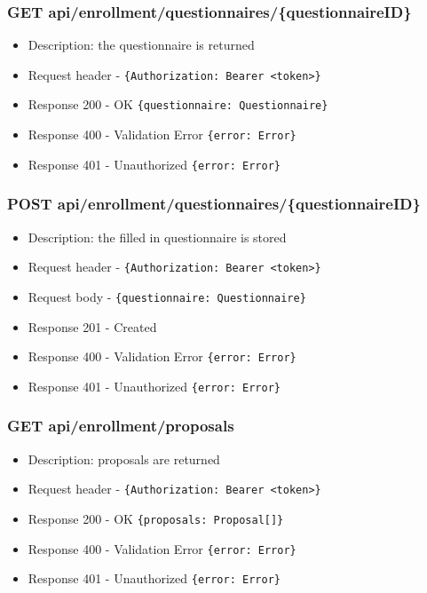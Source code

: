 \subsubsection{GET api/enrollment/questionnaires/\{questionnaireID\}}
\begin{itemize}
    \item Description: the questionnaire is returned
    \item Request header - \verb|{Authorization: Bearer <token>}|
    \item Response 200 - OK \verb|{questionnaire: Questionnaire}|
    \item Response 400 - Validation Error \verb|{error: Error}|
    \item Response 401 - Unauthorized \verb|{error: Error}|
\end{itemize}

\subsubsection{POST api/enrollment/questionnaires/\{questionnaireID\}}
\begin{itemize}
    \item Description: the filled in questionnaire is stored
    \item Request header - \verb|{Authorization: Bearer <token>}|
    \item Request body - \verb|{questionnaire: Questionnaire}|
    \item Response 201 - Created
    \item Response 400 - Validation Error \verb|{error: Error}|
    \item Response 401 - Unauthorized \verb|{error: Error}|
\end{itemize}

\subsubsection{GET api/enrollment/proposals}
\begin{itemize}
    \item Description: proposals are returned
    \item Request header - \verb|{Authorization: Bearer <token>}|
    \item Response 200 - OK \verb|{proposals: Proposal[]}|
    \item Response 400 - Validation Error \verb|{error: Error}|
    \item Response 401 - Unauthorized \verb|{error: Error}|
\end{itemize}

